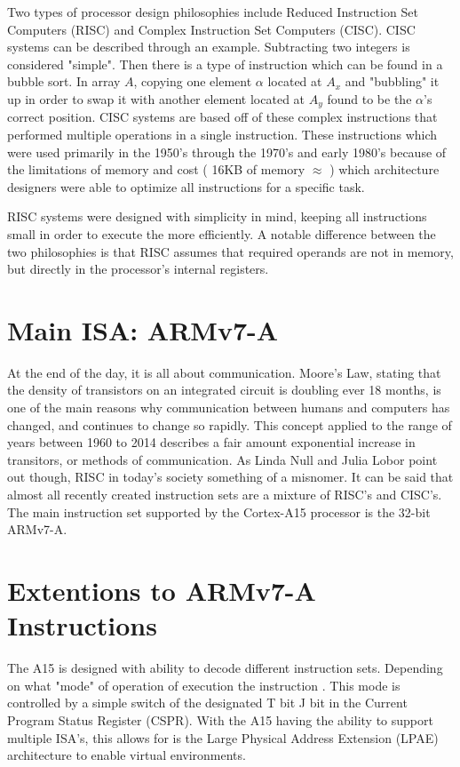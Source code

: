 \documentclass[12pt]{scrreprt}
\begin{document}
	Two types of processor design philosophies include Reduced Instruction Set Computers (RISC) and Complex Instruction Set Computers (CISC).
	CISC systems can be described through an example. Subtracting two integers is considered "simple". Then there is a type of instruction which 
	can be found in a bubble sort. In array $ A $, copying one element $ \alpha $ located at $ A_{x} $ and "bubbling" it up in order to swap it
	with another element located at $ A_{y} $ found to be the $ \alpha $'s correct position. CISC systems are based off of these complex 
	instructions that performed multiple operations in a single instruction. These instructions which were used primarily in the 1950's through the 1970's and early 1980's because of the limitations of memory and cost ( 16KB of memory $\approx$  ) which architecture designers were able to optimize all instructions for a specific task.

	RISC systems were designed with simplicity in mind, keeping all instructions small in order to execute the more efficiently. A notable
	difference between the two philosophies is that RISC assumes that required operands are not in memory, but directly in the processor's
	internal registers.

	\section{Main ISA: ARMv7-A}

	At the end of the day, it is all about communication. Moore's Law, stating that the density of transistors on an integrated circuit is doubling 
	ever 18 months, is one of the main reasons why communication between humans and computers has changed, and continues to change so rapidly. This 
	concept applied to the range of years between 1960 to 2014 describes a fair amount exponential increase in transitors, or methods of 
	communication. As Linda Null and Julia Lobor point out though, RISC in today's society something of a misnomer. It can be said that 
	almost all recently created instruction sets are a mixture of RISC's and CISC's. The main instruction set supported by the Cortex-A15 processor 
	is the 32-bit ARMv7-A. 

	\section{Extentions to ARMv7-A Instructions}

	The A15 is designed with ability to decode different instruction sets. Depending on what "mode" of operation of execution the instruction . This mode is controlled by a simple switch of the designated T bit  J bit in the Current Program Status Register (CSPR). With the A15 having the ability to support multiple ISA's, this allows for is the Large Physical Address Extension (LPAE) architecture to enable virtual environments.
\end{document}
